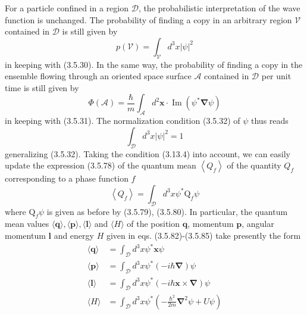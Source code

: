 \documentclass{article}
\begin{document}
For a particle confined in a region $\mathcal{D}$, the probabilistic interpretation of the wave function is unchanged. The probability of finding a copy in an arbitrary region $\mathcal{V}$ contained in $\mathcal{D}$ is still given by
$$
\begin{equation*}
p(\mathcal{V})=\int_{\mathcal{V}} d^{3} x|\psi|^{2} \tag{3.13.21}
\end{equation*}
$$
in keeping with (3.5.30). In the same way, the probability of finding a copy in the ensemble flowing through an oriented space surface $\mathcal{A}$ contained in $\mathcal{D}$ per unit time is still given by
$$
\begin{equation*}
\Phi(\mathcal{A})=\frac{\hbar}{m} \int_{\mathcal{A}} d^{2} \boldsymbol{x} \cdot \operatorname{Im}\left(\psi^{*} \boldsymbol{\nabla} \psi\right) \tag{3.13.22}
\end{equation*}
$$
in keeping with (3.5.31). The normalization condition (3.5.32) of $\psi$ thus reads
$$
\begin{equation*}
\int_{\mathcal{D}} d^{3} x|\psi|^{2}=1 \tag{3.13.23}
\end{equation*}
$$
generalizing (3.5.32).
Taking the condition (3.13.4) into account, we can easily update the expression (3.5.78) of the quantum mean $\left\langle Q_{f}\right\rangle$ of the quantity $Q_{f}$ corresponding to a phase function $f$
$$
\begin{equation*}
\left\langle Q_{f}\right\rangle=\int_{\mathcal{D}} d^{3} x \psi^{*} \mathrm{Q}_{f} \psi \tag{3.13.24}
\end{equation*}
$$
where $\mathrm{Q}_{f} \psi$ is given as before by (3.5.79), (3.5.80). In particular, the quantum mean values $\langle\boldsymbol{q}\rangle,\langle\boldsymbol{p}\rangle,\langle\boldsymbol{l}\rangle$ and $\langle H\rangle$ of the position $\boldsymbol{q}$, momentum $\boldsymbol{p}$, angular momentum $\boldsymbol{l}$ and energy $H$ given in eqs. (3.5.82)-(3.5.85) take presently the form
$$
\begin{align*}
\langle\boldsymbol{q}\rangle & =\int_{\mathcal{D}} d^{3} x \psi^{*} \boldsymbol{x} \psi  \tag{3.13.25}\\
\langle\boldsymbol{p}\rangle & =\int_{\mathcal{D}} d^{3} x \psi^{*}(-i \hbar \boldsymbol{\nabla}) \psi  \tag{3.13.26}\\
\langle\boldsymbol{l}\rangle & =\int_{\mathcal{D}} d^{3} x \psi^{*}(-i \hbar \boldsymbol{x} \times \boldsymbol{\nabla}) \psi  \tag{3.13.27}\\
\langle H\rangle & =\int_{\mathcal{D}} d^{3} x \psi^{*}\left(-\frac{\hbar^{2}}{2 m} \boldsymbol{\nabla}^{2} \psi+U \psi\right) \tag{3.13.28}
\end{align*}
$$
\end{document}
